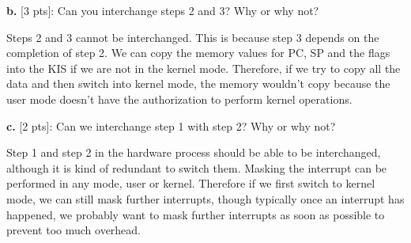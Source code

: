 \documentclass[12pt]{article}
\begin{document}
{\bf b.} [3 pts]: Can you interchange steps 2 and 3? Why or why not?

Steps 2 and 3 cannot be interchanged. This is because step 3 depends on the completion of step 2. We can copy the memory values for PC, SP and the flags into the KIS if we are not in the kernel mode. Therefore, if we try to copy all the data and then switch into kernel mode, the memory wouldn't copy because the user mode doesn't have the authorization to perform kernel operations. 

{\bf c.} [2 pts]: Can we interchange step 1 with step 2? Why or why not?

Step 1 and step 2 in the hardware process should be able to be interchanged, although it is kind of redundant to switch them. Masking the interrupt can be performed in any mode, user or kernel. Therefore if we first switch to kernel mode, we can still mask further interrupts, though typically once an interrupt has happened, we probably want to mask further interrupts as soon as possible to prevent too much overhead. 
\end{document}
